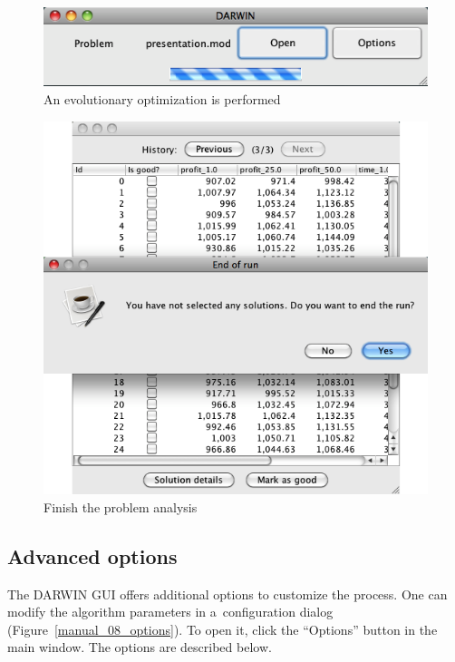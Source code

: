 \begin{figure}
  \centering
  \includegraphics[scale=0.7]{img/manual/06_evolutionary_loop}
  \caption{An evolutionary optimization is performed}
  \label{manual_06_evo_loop}
\end{figure}

\begin{figure}
  \centering
  \includegraphics[scale=0.7]{img/manual/07_end_of_run}
  \caption{Finish the problem analysis}
  \label{manual_07_finish}
\end{figure}

\clearpage{}
\subsection*{Advanced options}

The DARWIN GUI offers additional options to customize the process. One can
modify the algorithm parameters in a~configuration dialog
(Figure~\ref{manual_08_options}). To open it, click the ``Options'' button in
the main window. The options are described below.

